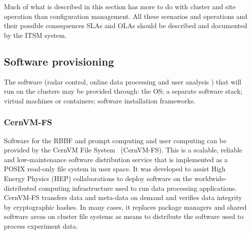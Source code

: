 \documentclass[12pt,a4paper]{article}
\begin{document}
Much of what is described in this section has more to do with cluster and site operation than configuration management. All these scenarios and operations and their possible consequences SLAs and OLAs should be described and documented by the ITSM system.







\subsection{Software provisioning} \label{ssec:software}

The software (radar control, online data processing and user analysis ) that will run on the clusters may be provided through: the OS; a separate software stack; virtual machines or containers; software installation frameworks.

\subsubsection{CernVM-FS} \label{ssec:cernvmfs}
Software for the RBBF and prompt computing and user computing can be provided by the CernVM File System~\cite{cernvmfs} (CernVM-FS). 
This is a scalable, reliable and low-maintenance software distribution service that is implemented as a POSIX read-only file system in user space. 
It was developed to assist High Energy Physics (HEP) collaborations to deploy software on the worldwide-distributed computing infrastructure used to run data processing applications. 
CernVM-FS transfers data and meta-data on demand and verifies data integrity by cryptographic hashes.
In many cases, it replaces package managers and shared software areas on cluster file systems as means to distribute the software used to process experiment data. 
\end{document}
